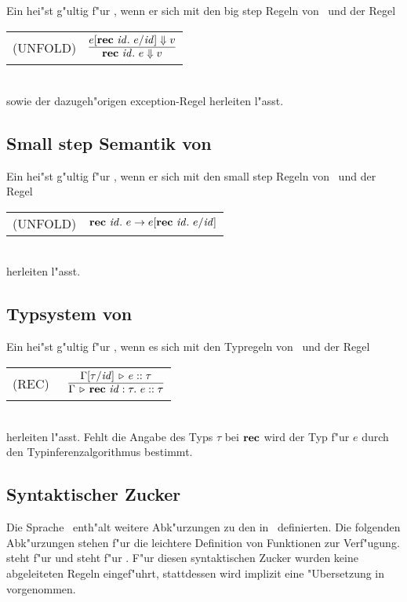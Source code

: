 Ein  hei"st g"ultig f"ur \LTWO, wenn er sich mit den big step Regeln von \LONE\ und der Regel\\[3mm]
  \begin{tabular}{ll}
    \mbox{(UNFOLD)}      & $\regel{e[\rec{\id}{e}/\id] \eval v}
                                  {\rec{\id}{e} \eval v}$
  \end{tabular}\\[7mm]
sowie der dazugeh"origen exception-Regel herleiten l"asst.


\subsection{Small step Semantik von \LTWO}

Ein  hei"st g"ultig f"ur \LTWO, wenn er sich mit den small step Regeln von \LONE\ und der Regel\\[3mm]
  \begin{tabular}{ll}
    \mbox{(UNFOLD)}     & $\textbf{rec}\ {\text{\it id\/}}.\ e \to e[\textbf{rec}\ {\text{\it id\/}}.\ e/{\text{\it id\/}}]$
  \end{tabular}\\[7mm]
herleiten l"asst.


\subsection{Typsystem von \LTWO}

Ein  hei"st g"ultig f"ur \LTWO, wenn es sich mit den Typregeln von \LONE\ und der Regel\\[3mm]
\begin{tabular}{ll}
\mbox{(REC)\ } & $\regel{\Tj{\Gamma[\tau/\id]}{e}{\tau}} 
                         {\Tj{\Gamma}{\rec{\id:\tau}{e}}{\tau}}$
\end{tabular}\\[7mm]
herleiten l"asst. Fehlt die Angabe des Typs $\tau$ bei $\textbf{rec}$ wird der Typ f"ur $e$ durch den Typinferenzalgorithmus
bestimmt.


\subsection{Syntaktischer Zucker}

Die Sprache \LTWO\ enth"alt weitere Abk"urzungen zu den in \LONE\ definierten. Die folgenden Abk"urzungen stehen f"ur
die leichtere Definition von Funktionen zur Verf"ugung.
\beqns
\eeqns
steht f"ur
\beqns
\eeqns
und
\beqns
\eeqns
steht f"ur
\beqns
  \mbox{.}
\eeqns
F"ur diesen syntaktischen Zucker wurden keine abgeleiteten Regeln eingef"uhrt, stattdessen wird implizit
eine "Ubersetzung in  vorgenommen.



